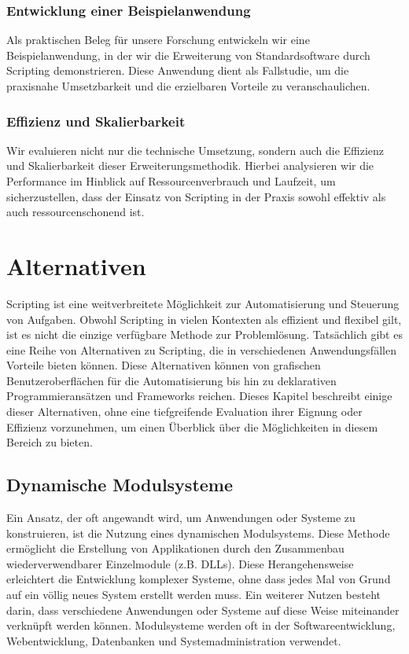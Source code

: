 \subsubsection*{Entwicklung einer Beispielanwendung}
Als praktischen Beleg für unsere Forschung entwickeln wir eine Beispielanwendung, in der wir 
die Erweiterung von Standardsoftware durch Scripting demonstrieren. Diese Anwendung dient als 
Fallstudie, um die praxisnahe Umsetzbarkeit und die erzielbaren Vorteile zu veranschaulichen.

\subsubsection*{Effizienz und Skalierbarkeit}
Wir evaluieren nicht nur die technische Umsetzung, sondern auch die Effizienz und Skalierbarkeit 
dieser Erweiterungsmethodik. Hierbei analysieren wir die Performance im Hinblick auf 
Ressourcenverbrauch und Laufzeit, um sicherzustellen, dass der Einsatz von Scripting in der 
Praxis sowohl effektiv als auch ressourcenschonend ist.

\newpage

\section{Alternativen}

Scripting ist eine weitverbreitete Möglichkeit zur Automatisierung und Steuerung von Aufgaben. 
Obwohl Scripting in vielen Kontexten als effizient und flexibel gilt, ist es nicht die 
einzige verfügbare Methode zur Problemlösung. Tatsächlich gibt es eine Reihe von 
Alternativen zu Scripting, die in verschiedenen Anwendungsfällen Vorteile bieten können. 
Diese Alternativen können von grafischen Benutzeroberflächen für die Automatisierung bis 
hin zu deklarativen Programmieransätzen und Frameworks reichen. Dieses Kapitel beschreibt 
einige dieser Alternativen, ohne eine tiefgreifende Evaluation ihrer Eignung oder Effizienz 
vorzunehmen, um einen Überblick über die Möglichkeiten in diesem Bereich zu bieten.

\subsection*{Dynamische Modulsysteme}

Ein Ansatz, der oft angewandt wird, um Anwendungen oder Systeme zu konstruieren, 
ist die Nutzung eines dynamischen Modulsystems. Diese Methode ermöglicht die Erstellung 
von Applikationen durch den Zusammenbau wiederverwendbarer Einzelmodule (z.B. DLLs). 
Diese Herangehensweise erleichtert die Entwicklung komplexer Systeme, ohne dass jedes 
Mal von Grund auf ein völlig neues System erstellt werden muss. Ein weiterer Nutzen besteht darin, 
dass verschiedene Anwendungen oder Systeme auf diese Weise miteinander verknüpft werden können.
Modulsysteme werden oft in der Softwareentwicklung, Webentwicklung, 
Datenbanken und Systemadministration verwendet. \cite{modulsystem}

